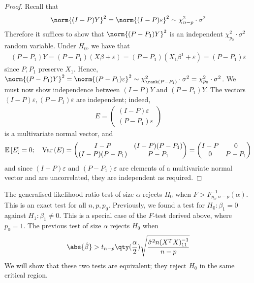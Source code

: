 \begin{proof}
	Recall that
	\begin{align*}
		\norm{(I-P)Y}^2 = \norm{(I-P)\varepsilon}^2 \sim \chi^2_{n-p} \cdot \sigma^2
	\end{align*}
	Therefore it suffices to show that $\norm{(P-P_1)Y}^2$ is an independent $\chi^2_{p_0} \cdot \sigma^2$ random variable.
	Under $H_0$, we have that
	\begin{align*}
		(P-P_1)Y = (P-P_1)(X\beta+\varepsilon) = (P-P_1)(X_1 \beta^1 + \varepsilon) = (P-P_1)\varepsilon
	\end{align*}
	since $P, P_1$ preserve $X_1$.
	Hence, $\norm{(P-P_1)Y}^2 = \norm{(P-P_1)\varepsilon}^2 \sim \chi^2_{\rank (P-P_1)} \cdot \sigma^2 = \chi^2_{p_0} \cdot \sigma^2$.
	We must now show independence between $(I-P)Y$ and $(P-P_1)Y$.
	The vectors $(I-P)\varepsilon, (P-P_1)\varepsilon$ are independent; indeed,
	\begin{align*}
		E = \begin{pmatrix}
			(I-P)\varepsilon \\
			(P-P_1)\varepsilon
		\end{pmatrix}
	\end{align*}
	is a multivariate normal vector, and
	\begin{align*}
		\mathbb{E}\left[{E}\right] = 0;\quad \operatorname{Var}\left({E}\right) = \begin{pmatrix}
			I-P          & (I-P)(P-P_1) \\
			(I-P)(P-P_1) & P-P_1
		\end{pmatrix} = \begin{pmatrix}
			I-P & 0     \\
			0   & P-P_1
		\end{pmatrix}
	\end{align*}
	and since $(I-P)\varepsilon$ and $(P-P_1)\varepsilon$ are elements of a multivariate normal vector and are uncorrelated, they are independent as required.
\end{proof}
The generalised likelihood ratio test of size $\alpha$ rejects $H_0$ when $F > F^{-1}_{p_0,n-p}(\alpha)$.
This is an exact test for all $n, p, p_0$.
Previously, we found a test for $H_0\colon \beta_1 = 0$ against $H_1 \colon \beta_1 \neq 0$.
This is a special case of the $F$-test derived above, where $p_0 = 1$.
The previous test of size $\alpha$ rejects $H_0$ when
\begin{align*}
	\abs{\hat\beta} > t_{n-p}\qty(\frac{\alpha}{2}) \sqrt{\frac{\hat\sigma^2 n (X^\tran X)^{-1}_{11}}{n-p}}
\end{align*}
We will show that these two tests are equivalent; they reject $H_0$ in the same critical region.
